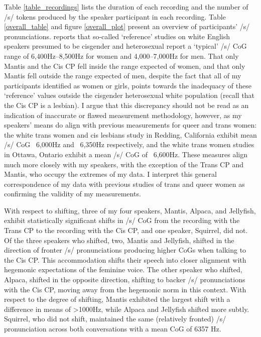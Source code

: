 \documentclass[12pt,twoside]{reedthesis}
\begin{document}
Table \ref{table_recordings} lists the duration of each recording and the number of /s/ tokens produced by the speaker participant in each recording. Table \ref{overall_table} and figure \ref{overall_plot} present an overview of participants' /s/ pronunciations. \textcite{zimman_variability_2017} reports that so-called `reference' studies on white English speakers presumed to be cisgender and heterosexual report a `typical' /s/ CoG range of 6,400Hz--8,500Hz for women and 4,000--7,000Hz for men. That only Mantis and the Cis CP fell inside the range expected of women, and that only Mantis fell outside the range expected of men, despite the fact that all of my participants identified as women or girls, points towards the inadequacy of these `reference' values outside the cisgender heterosexual white population (recall that the Cis CP is a lesbian). I argue that this discrepancy should not be read as an indication of inaccurate or flawed measurement methodology, however, as my speakers' means do align with previous measurements for queer and trans women: the white trans women and cis lesbians \textcite{podesva_sexuality_2015} study in Redding, California exhibit mean /s/ CoG ~6,000Hz and ~6,350Hz respectively, and the white trans women \textcite{hazenberg_language_2012} studies in Ottawa, Ontario exhibit a mean /s/ CoG of ~6,600Hz. These measures align much more closely with my speakers, with the exception of the Trans CP and Mantis, who occupy the extremes of my data. I interpret this general correspondence of my data with previous studies of trans and queer women as confirming the validity of my measurements.

With respect to shifting, three of my four speakers, Mantis, Alpaca, and Jellyfish, exhibit statistically significant shifts in /s/ CoG from the recording with the Trans CP to the recording with the Cis CP, and one speaker, Squirrel, did not. Of the three speakers who shifted, two, Mantis and Jellyfish, shifted in the direction of fronter /s/ pronunciations producing higher CoGs when talking to the Cis CP. This accommodation shifts their speech into closer alignment with hegemonic expectations of the feminine voice. The other speaker who shifted, Alpaca, shifted in the opposite direction, shifting to backer /s/ pronunciations with the Cis CP, moving away from the hegemonic norm in this context. With respect to the degree of shifting, Mantis exhibited the largest shift with a difference in means of >1000Hz, while Alpaca and Jellyfish shifted more subtly. Squirrel, who did not shift, maintained the same (relatively fronted) /s/ pronunciation across both conversations with a mean CoG of 6357 Hz.
\end{document}
